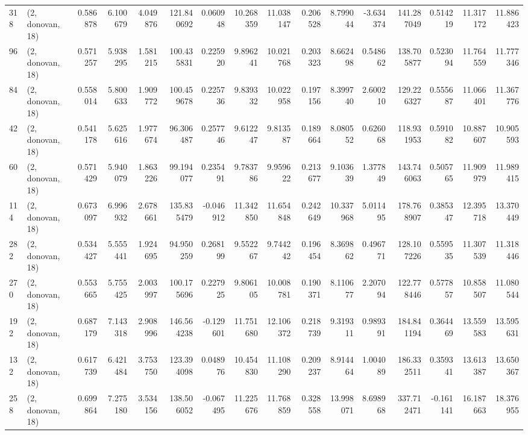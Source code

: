 \begin{tabular}{llrrrrrrrrrrrrrr}
318 &  (2, donovan, 18) &   0.586878 &   6.100679 &   4.049876 &   121.840692 &   0.060948 &  10.268359 &  11.038147 &  0.206528 &   8.799044 &  -3.634374 &   141.287049 &   0.514219 &  11.317172 &  11.886423 \\
96  &  (2, donovan, 18) &   0.571257 &   5.938295 &   1.581215 &   100.435831 &   0.225920 &   9.896241 &  10.021768 &  0.203323 &   8.662498 &   0.548662 &   138.705877 &   0.523094 &  11.764559 &  11.777346 \\
84  &  (2, donovan, 18) &   0.558014 &   5.800633 &   1.909772 &   100.459678 &   0.225736 &   9.839332 &  10.022958 &  0.197156 &   8.399740 &   2.600210 &   129.226327 &   0.555687 &  11.066401 &  11.367776 \\
42  &  (2, donovan, 18) &   0.541178 &   5.625616 &   1.977674 &    96.306487 &   0.257746 &   9.612247 &   9.813587 &  0.189664 &   8.080552 &   0.626068 &   118.931953 &   0.591082 &  10.887607 &  10.905593 \\
60  &  (2, donovan, 18) &   0.571429 &   5.940079 &   1.863226 &    99.194077 &   0.235491 &   9.783786 &   9.959622 &  0.213677 &   9.103639 &   1.377849 &   143.746063 &   0.505765 &  11.909979 &  11.989415 \\
114 &  (2, donovan, 18) &   0.673097 &   6.996932 &   2.678661 &   135.835479 &  -0.046912 &  11.342850 &  11.654848 &  0.242649 &  10.337968 &   5.011495 &   178.768907 &   0.385347 &  12.395718 &  13.370449 \\
282 &  (2, donovan, 18) &   0.534427 &   5.555441 &   1.924695 &    94.950259 &   0.268199 &   9.552267 &   9.744242 &  0.196454 &   8.369862 &   0.496771 &   128.107226 &   0.559535 &  11.307539 &  11.318446 \\
270 &  (2, donovan, 18) &   0.553665 &   5.755425 &   2.003997 &   100.175696 &   0.227925 &   9.806105 &  10.008781 &  0.190371 &   8.110677 &   2.207094 &   122.778446 &   0.577857 &  10.858507 &  11.080544 \\
192 &  (2, donovan, 18) &   0.687179 &   7.143318 &   2.908996 &   146.564238 &  -0.129601 &  11.751680 &  12.106372 &  0.218739 &   9.319311 &   0.989391 &   184.841194 &   0.364469 &  13.559583 &  13.595631 \\
132 &  (2, donovan, 18) &   0.617739 &   6.421484 &   3.753750 &   123.394098 &   0.048976 &  10.454830 &  11.108290 &  0.209237 &   8.914464 &   1.004089 &   186.332511 &   0.359341 &  13.613387 &  13.650367 \\
258 &  (2, donovan, 18) &   0.699864 &   7.275180 &   3.534156 &   138.506052 &  -0.067495 &  11.225676 &  11.768859 &  0.328558 &  13.998071 &   8.698968 &   337.712471 &  -0.161141 &  16.187663 &  18.376955 \\

\end{tabular}
